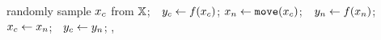 \Procedure{\opoea}{$\objFun:\solutionSpace\mapsto \realNumbers$}%
%
\State randomly sample $\solutioni{c}$ from $\solutionSpace$;~~$\ovali{c} \gets \objFunb{\solutioni{c}}$;%
%
%
\State $\solutioni{n} \gets \opUnary(\solutioni{c})$;~~$\ovali{n} \gets \objFunb{\solutioni{n}}$;%
%
~~$\solutioni{c} \gets \solutioni{n}$;~~$\ovali{c} \gets \ovali{n}$;%
\EndIf%
%
\EndWhile%
\Return {}, %
\EndProcedure%
